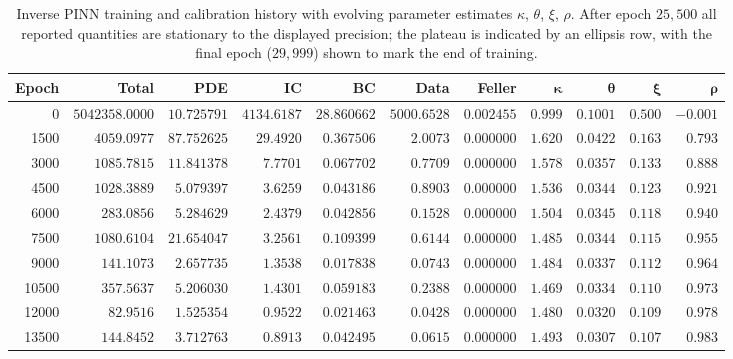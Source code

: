 \begin{table}[H]
    \centering
    \footnotesize
    \setlength{\tabcolsep}{2.5pt}
    \renewcommand{\arraystretch}{1.2}
    \caption{Inverse PINN training and calibration history with evolving parameter estimates $\kappa$, $\theta$, $\xi$, $\rho$. After epoch $25{,}500$ all reported quantities are stationary to the displayed precision; the plateau is indicated by an ellipsis row, with the final epoch ($29{,}999$) shown to mark the end of training.}
    \label{tab:inverse_pinn_calibration_history}
    \begin{adjustbox}{max width=\linewidth}
    \begin{tabular}{rrrrrrrrrrr}
        \hline
        \textbf{Epoch} & \textbf{Total} & \textbf{PDE} & \textbf{IC} & \textbf{BC} & \textbf{Data} & \textbf{Feller} & $\boldsymbol{\kappa}$ & $\boldsymbol{\theta}$ & $\boldsymbol{\xi}$ & $\boldsymbol{\rho}$ \\
        \hline
             0 & $5042358.0000$ & $10.725791$ & $4134.6187$ & $28.860662$ & $5000.6528$ & $0.002455$ & $0.999$ & $0.1001$ & $0.500$ & $-0.001$ \\
          1500 & $4059.0977$    & $87.752625$ & $29.4920$   & $0.367506$  & $2.0073$    & $0.000000$ & $1.620$ & $0.0422$ & $0.163$ & $0.793$ \\
          3000 & $1085.7815$    & $11.841378$ & $7.7701$    & $0.067702$  & $0.7709$    & $0.000000$ & $1.578$ & $0.0357$ & $0.133$ & $0.888$ \\
          4500 & $1028.3889$    & $5.079397$  & $3.6259$    & $0.043186$  & $0.8903$    & $0.000000$ & $1.536$ & $0.0344$ & $0.123$ & $0.921$ \\
          6000 & $283.0856$     & $5.284629$  & $2.4379$    & $0.042856$  & $0.1528$    & $0.000000$ & $1.504$ & $0.0345$ & $0.118$ & $0.940$ \\
          7500 & $1080.6104$    & $21.654047$ & $3.2561$    & $0.109399$  & $0.6144$    & $0.000000$ & $1.485$ & $0.0344$ & $0.115$ & $0.955$ \\
          9000 & $141.1073$     & $2.657735$  & $1.3538$    & $0.017838$  & $0.0743$    & $0.000000$ & $1.484$ & $0.0337$ & $0.112$ & $0.964$ \\
         10500 & $357.5637$     & $5.206030$  & $1.4301$    & $0.059183$  & $0.2388$    & $0.000000$ & $1.469$ & $0.0334$ & $0.110$ & $0.973$ \\
         12000 & $82.9516$      & $1.525354$  & $0.9522$    & $0.021463$  & $0.0428$    & $0.000000$ & $1.480$ & $0.0320$ & $0.109$ & $0.978$ \\
         13500 & $144.8452$     & $3.712763$  & $0.8913$    & $0.042495$  & $0.0615$    & $0.000000$ & $1.493$ & $0.0307$ & $0.107$ & $0.983$ \\

\end{tabular}
\end{adjustbox}
\end{table}
